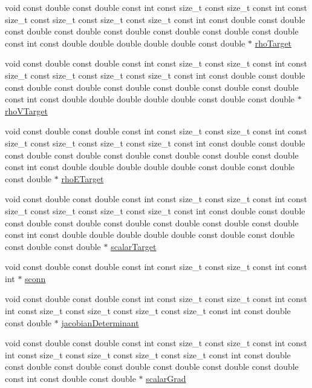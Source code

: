 \begin{DoxyCompactItemize}
\item 
void const double const double const int const size\+\_\+t const size\+\_\+t const int const size\+\_\+t const size\+\_\+t const size\+\_\+t const size\+\_\+t const int const double const double const double const double const double const double const double const double const int const double double double double double const double $\ast$ \hyperlink{SATKernels_8H_a3499ab88b8b2ace36d84356b19632298}{rho\+Target}
\item 
void const double const double const int const size\+\_\+t const size\+\_\+t const int const size\+\_\+t const size\+\_\+t const size\+\_\+t const size\+\_\+t const int const double const double const double const double const double const double const double const double const int const double double double double double const double const double $\ast$ \hyperlink{SATKernels_8H_aca8f44b9d6cddd0f8e4997848b063b4c}{rho\+V\+Target}
\item 
void const double const double const int const size\+\_\+t const size\+\_\+t const int const size\+\_\+t const size\+\_\+t const size\+\_\+t const size\+\_\+t const int const double const double const double const double const double const double const double const double const int const double double double double double const double const double const double $\ast$ \hyperlink{SATKernels_8H_a77cd7df787748ecffdb67100fb5ae013}{rho\+E\+Target}
\item 
void const double const double const int const size\+\_\+t const size\+\_\+t const int const size\+\_\+t const size\+\_\+t const size\+\_\+t const size\+\_\+t const int const double const double const double const double const double const double const double const double const int const double double double double double const double const double const double const double $\ast$ \hyperlink{SATKernels_8H_a3dcb404dac2bbafd2e5ac51b38fd8549}{scalar\+Target}
\item 
void const double const double const int const size\+\_\+t const size\+\_\+t const int const int $\ast$ \hyperlink{SATKernels_8H_a09eb314e5f0d178313086632ffd7193e}{sconn}
\item 
void const double const double const int const size\+\_\+t const size\+\_\+t const int const int const size\+\_\+t const size\+\_\+t const size\+\_\+t const size\+\_\+t const int const double const double $\ast$ \hyperlink{SATKernels_8H_af927ee3df09e556d50c34f0e1d279a8c}{jacobian\+Determinant}
\item 
void const double const double const int const size\+\_\+t const size\+\_\+t const int const int const size\+\_\+t const size\+\_\+t const size\+\_\+t const size\+\_\+t const int const double const double const double const double const double const double const double const int const double const double $\ast$ \hyperlink{SATKernels_8H_ad7f181d487933e1f440902dc6f080e54}{scalar\+Grad}

\end{DoxyCompactItemize}

